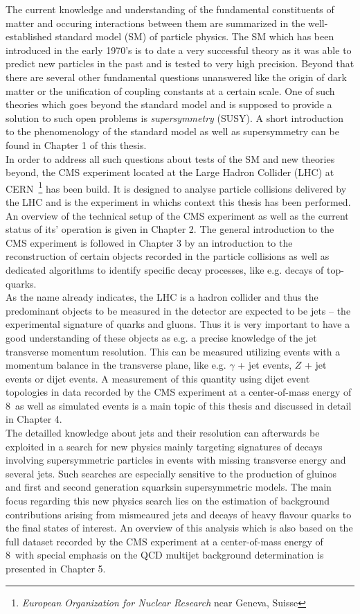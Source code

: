 The current knowledge and understanding of the fundamental constituents of matter and occuring interactions between them are summarized in the well-established standard model (SM) of particle physics. The SM which has been introduced in the early 1970's is to date a very successful theory as it was able to predict new particles in the past and is tested to very high precision. Beyond that there are several other fundamental questions unanswered like the origin of dark matter or the unification of coupling constants at a certain scale. One of such theories which goes beyond the standard model and is supposed to provide a solution to such open problems is \textit{supersymmetry} (SUSY). A short introduction to the phenomenology of the standard model as well as supersymmetry can be found in Chapter 1 of this thesis. \\
In order to address all such questions about tests of the SM and new theories beyond, the CMS experiment located at the Large Hadron Collider (LHC) at CERN~\footnote{\textit{European Organization for Nuclear Research} near Geneva, Suisse} has been build. It is designed to analyse particle collisions delivered by the LHC and is the experiment in whichs context this thesis has been performed. An overview of the technical setup of the CMS experiment as well as the current status of its' operation is given in Chapter 2. The general introduction to the CMS experiment is followed in Chapter 3 by an introduction to the reconstruction of certain objects recorded in the particle collisions as well as dedicated algorithms to identify specific decay processes, like e.g. decays of top-quarks. \\
As the name already indicates, the LHC is a hadron collider and thus the predominant objects to be measured in the detector are expected to be jets -- the experimental signature of quarks and gluons. Thus it is very important to have a good understanding of these objects as e.g. a precise knowledge of the jet transverse momentum resolution. This can be measured utilizing events with a momentum balance in the transverse plane, like e.g. $\gamma$ + jet events, $Z$ + jet events or dijet events. A measurement of this quantity using dijet event topologies in data recorded by the CMS experiment at a center-of-mass energy of 8~\tev as well as simulated events is a main topic of this thesis and discussed in detail in Chapter 4. \\
The detailled knowledge about jets and their resolution can afterwards be exploited in a search for new physics mainly targeting signatures of decays involving supersymmetric particles in events with missing transverse energy and several jets. Such searches are especially sensitive to the production of gluinos and first and second generation squarksin supersymmetric models. The main focus regarding this new physics search lies on the estimation of background contributions arising from mismeaured jets and decays of heavy flavour quarks to the final states of interest. An overview of this analysis which is also based on the full dataset recorded by the CMS experiment at a center-of-mass energy of 8~\tev with special emphasis on the QCD multijet background determination is presented in Chapter 5. \\
